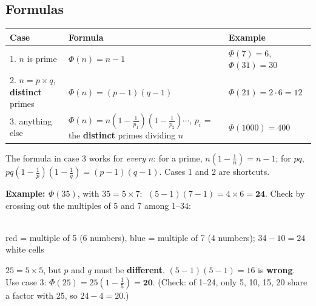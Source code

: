 \subsection{Formulas}
\begin{center}\small
\begin{tabularx}{\textwidth}{@{}l X l@{}}
\toprule
Case & Formula & Example\\
\midrule
1. $n$ is prime & $\Phi(n) = n - 1$ & $\Phi(7) = 6$, $\Phi(31) = 30$\\
2. $n = p \times q$, \textbf{distinct} primes & $\Phi(n) = (p-1)(q-1)$ & $\Phi(21) = 2\cdot6 = 12$\\
3. anything else & $\Phi(n) = n\left(1 - \frac{1}{p_1}\right)\left(1 - \frac{1}{p_2}\right)\cdots$, \;$p_i$ = the \textbf{distinct} primes dividing $n$ & $\Phi(1000) = 400$\\
\bottomrule
\end{tabularx}
\end{center}
The formula in case 3 works for \emph{every} $n$: for a prime, $n(1 - \frac1n) = n - 1$; for $pq$, $pq(1-\frac1p)(1-\frac1q) = (p-1)(q-1)$. Cases 1 and 2 are shortcuts.

\textbf{Example: $\Phi(35)$}, with $35 = 5 \times 7$: $\;(5-1)(7-1) = 4 \times 6 = \mathbf{24}$. Check by crossing out the multiples of 5 and 7 among 1--34:
\begin{center}
\\[2pt]
{\footnotesize red = multiple of 5 (6 numbers), blue = multiple of 7 (4 numbers); $34 - 10 = 24$ white cells}
\end{center}

\begin{keybox}[title=Trap: repeated prime factors]
$25 = 5 \times 5$, but $p$ and $q$ must be \textbf{different}. $(5-1)(5-1) = 16$ is \textbf{wrong}.
Use case 3: $\Phi(25) = 25\left(1 - \frac15\right) = \mathbf{20}$. (Check: of 1--24, only 5, 10, 15, 20 share a factor with 25, so $24 - 4 = 20$.)
\end{keybox}

